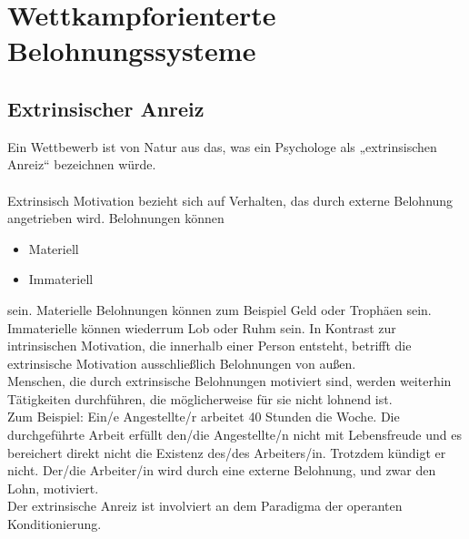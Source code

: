 \chapter{Wettkampforienterte Belohnungssysteme}
\reiter
 
	\section{Extrinsischer Anreiz}
	
Ein Wettbewerb ist von Natur aus das, was ein Psychologe als „extrinsischen Anreiz“ bezeichnen würde. \\\\
Extrinsisch Motivation bezieht sich auf Verhalten, das durch externe Belohnung angetrieben wird. Belohnungen können 
  
		\begin{itemize}
			\item Materiell
  		\item Immateriell
		\end{itemize}
		
sein. Materielle Belohnungen können zum Beispiel Geld oder Trophäen sein. Immaterielle können wiederrum Lob oder Ruhm sein. In Kontrast zur intrinsischen Motivation, die innerhalb einer Person entsteht, betrifft die extrinsische Motivation ausschließlich Belohnungen von außen. \\

Menschen, die durch extrinsische Belohnungen motiviert sind, werden weiterhin Tätigkeiten durchführen, die möglicherweise für sie nicht lohnend ist. \\
Zum Beispiel: Ein/e Angestellte/r arbeitet 40 Stunden die Woche. Die durchgeführte Arbeit erfüllt den/die Angestellte/n nicht mit Lebensfreude und es bereichert direkt nicht die Existenz des/des Arbeiters/in. Trotzdem kündigt er nicht. Der/die Arbeiter/in wird durch eine externe Belohnung, und zwar den Lohn, motiviert. \\
Der extrinsische Anreiz ist involviert an dem Paradigma der operanten Konditionierung. \\



